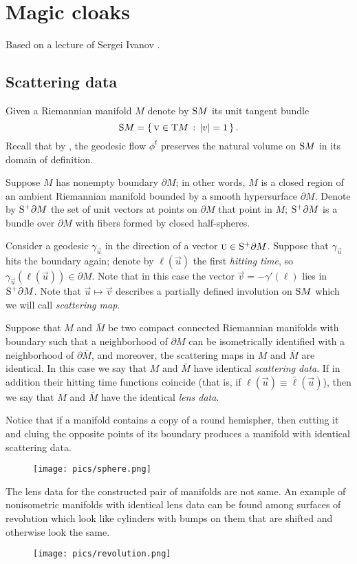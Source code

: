 \chapter{Magic cloaks}

Based on a lecture of Sergei Ivanov \cite{ivanov-2012}.

\section{Scattering data}

Given a Riemannian manifold $M$ denote by $\S M$ its unit tangent bundle
\[\S M=\set{\vec v\in \T M}{|v|=1}.\]
Recall that by , the geodesic flow $\phi^t$ preserves the natural volume on $\S M$ in its domain of definition.

Suppose $M$ has nonempty boundary $\partial M$;
in other words, $M$ is a closed region of an ambient Riemannian  manifold bounded by a smooth hypersurface $\partial M$.
Denote by $\S^+ \partial M$ the set of unit vectors at points on $\partial M$ that point in $M$;
$\S^+ \partial M$ is a bundle over $\partial M$ with fibers formed by closed half-spheres.

Consider a geodesic $\gamma_{\vec u}$ in the direction of a vector $\vec u\in \S^+ \partial M$.
Suppose that $\gamma_{\vec u}$ hits the boundary again; 
denote by $\ell(\vec u)$ the first \emph{hitting time}, so $\gamma_{\vec u}(\ell(\vec u))\in \partial M$.
Note that in this case the vector $\vec v=-\gamma'(\ell)$ lies in $\S^+ \partial M$.
Note that $\vec u\mapsto \vec v$ describes a partially defined involution on $\S M$ which we will call \emph{scattering map}.

Suppose that $M$ and $\bar M$ be two compact connected Riemannian manifolds with boundary such that a neighborhood of $\partial M$ can be isometrically identified with a neighborhood of $\partial \bar M$,
and moreover, the scattering maps in $M$ and $\bar M$ are identical.
In this case we say that $M$ and $\bar M$ have identical  \emph{scattering data}.
If in addition their hitting time functions  coincide (that is, if $\ell(\vec u)\equiv\bar\ell(\vec u)$), then we say that $M$ and $\bar M$ have the identical \emph{lens data}.

Notice that if a manifold contains a copy of a round hemispher, then cutting it and cluing the opposite points of its boundary produces a manifold with identical scattering data.
\begin{figure}[h!]
\centering
\texttt{[image: pics/sphere.png]}
\end{figure}
The lens data for the constructed pair of manifolds are not same.
An example of nonisometric manifolds with identical lens data can be found among surfaces of revolution which look like cylinders with bumps on them that are shifted and otherwise look the same.
\begin{figure}[h!]
\centering
\texttt{[image: pics/revolution.png]}
\end{figure}

